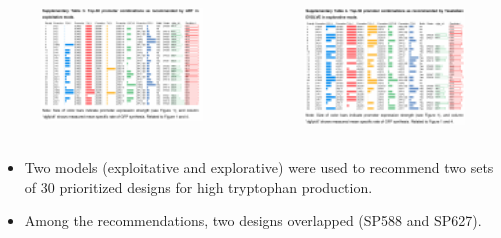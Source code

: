 \documentclass{beamer}
\begin{document}
\begin{frame}{}
		\begin{columns}
	    \begin{figure}
		\centering
		\includegraphics[width=4.8cm]{pic/图片19.pdf} 
 	    \end{figure}
	    \begin{figure}
		\centering
		\includegraphics[width=4.8cm]{pic/图片20.pdf}
 	    \end{figure}
        \end{columns}
    \begin{itemize} [<+-| alert@+>] %
        \item\scriptsize Two models (exploitative and explorative) were used to recommend two sets of 30 prioritized designs for high tryptophan production. 
        \item\scriptsize Among the recommendations, two designs overlapped (SP588 and SP627).
        
    \end{itemize} 


\end{frame}
\end{document}
